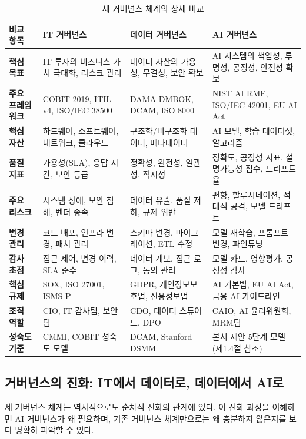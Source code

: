 \begin{table}[htbp]
\centering
\caption{세 거버넌스 체계의 상세 비교}
\label{tab:governance_detailed_comparison}
\begin{tabularx}{\textwidth}{|l|X|X|X|}
\hline
\textbf{비교 항목} & \textbf{IT 거버넌스} & \textbf{데이터 거버넌스} & \textbf{AI 거버넌스} \\ \hline
\textbf{핵심 목표} & IT 투자의 비즈니스 가치 극대화, 리스크 관리 & 데이터 자산의 가용성, 무결성, 보안 확보 & AI 시스템의 책임성, 투명성, 공정성, 안전성 확보 \\ \hline
\textbf{주요 프레임워크} & COBIT 2019, ITIL v4, ISO/IEC 38500 & DAMA-DMBOK, DCAM, ISO 8000 & NIST AI RMF, ISO/IEC 42001, EU AI Act \\ \hline
\textbf{핵심 자산} & 하드웨어, 소프트웨어, 네트워크, 클라우드 & 구조화/비구조화 데이터, 메타데이터 & AI 모델, 학습 데이터셋, 알고리즘 \\ \hline
\textbf{품질 지표} & 가용성(SLA), 응답 시간, 보안 등급 & 정확성, 완전성, 일관성, 적시성 & 정확도, 공정성 지표, 설명가능성 점수, 드리프트율 \\ \hline
\textbf{주요 리스크} & 시스템 장애, 보안 침해, 벤더 종속 & 데이터 유출, 품질 저하, 규제 위반 & 편향, 할루시네이션, 적대적 공격, 모델 드리프트 \\ \hline
\textbf{변경 관리} & 코드 배포, 인프라 변경, 패치 관리 & 스키마 변경, 마이그레이션, ETL 수정 & 모델 재학습, 프롬프트 변경, 파인튜닝 \\ \hline
\textbf{감사 초점} & 접근 제어, 변경 이력, SLA 준수 & 데이터 계보, 접근 로그, 동의 관리 & 모델 카드, 영향평가, 공정성 감사 \\ \hline
\textbf{핵심 규제} & SOX, ISO 27001, ISMS-P & GDPR, 개인정보보호법, 신용정보법 & AI 기본법, EU AI Act, 금융 AI 가이드라인 \\ \hline
\textbf{조직 역할} & CIO, IT 감사팀, 보안팀 & CDO, 데이터 스튜어드, DPO & CAIO, AI 윤리위원회, MRM팀 \\ \hline
\textbf{성숙도 기준} & CMMI, COBIT 성숙도 모델 & DCAM, Stanford DSMM & 본서 제안 5단계 모델 (제1.4절 참조) \\ \hline
\end{tabularx}
\end{table}

\subsection{거버넌스의 진화: IT에서 데이터로, 데이터에서 AI로}

세 거버넌스 체계는 역사적으로도 순차적 진화의 관계에 있다. 이 진화 과정을 이해하면 AI 거버넌스가 왜 필요하며, 기존 거버넌스 체계만으로는 왜 충분하지 않은지를 보다 명확히 파악할 수 있다.

